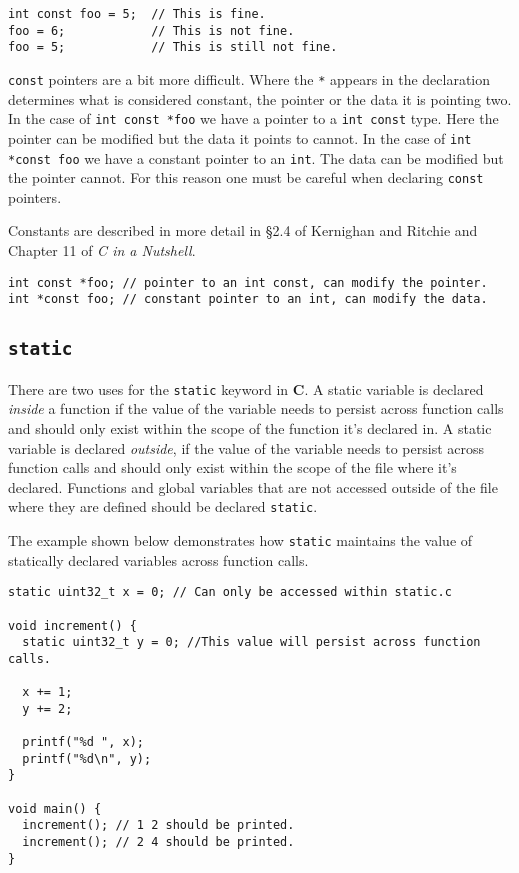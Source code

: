\documentclass[11pt]{article}
\begin{document}
\begin{lstlisting}
int const foo = 5;  // This is fine.
foo = 6;            // This is not fine.
foo = 5;            // This is still not fine.
\end{lstlisting}

\texttt{const} pointers are a bit more difficult. Where the \texttt{*} appears in
the declaration determines what is considered constant, the pointer or the data
it is pointing two. In the case of \texttt{int const *foo} we have a pointer to
a \texttt{int const} type. Here the pointer can be modified but the data it points
to cannot. In the case of \texttt{int *const foo} we have a constant pointer to
an \texttt{int}. The data can be modified but the pointer cannot. For this reason
one must be careful when declaring \texttt{const} pointers.

Constants are described in more detail in \S 2.4 of Kernighan and Ritchie and Chapter 11
of \emph{C in a Nutshell}.

\begin{lstlisting}
int const *foo; // pointer to an int const, can modify the pointer.
int *const foo; // constant pointer to an int, can modify the data.
\end{lstlisting}

\subsection{\texttt{static}}
There are two uses for the \texttt{static} keyword in \textbf{C}. A static
variable is declared \emph{inside} a function if the value of the variable
needs to persist across function calls and should only exist within the scope
of the function it's declared in. A static variable is declared \emph{outside}, if
the value of the variable needs to persist across function calls
and should only exist within the scope of the file where it's declared.
Functions and global variables that are not accessed outside of the file where they are
defined should be declared \texttt{static}.

The example shown below demonstrates
how \texttt{static} maintains the value of statically declared variables across
function calls.

\begin{lstlisting}[title=static.c]
static uint32_t x = 0; // Can only be accessed within static.c

void increment() {
  static uint32_t y = 0; //This value will persist across function calls.

  x += 1;
  y += 2;

  printf("%d ", x);
  printf("%d\n", y);
}

void main() {
  increment(); // 1 2 should be printed.
  increment(); // 2 4 should be printed.
}
\end{lstlisting}
\end{document}

